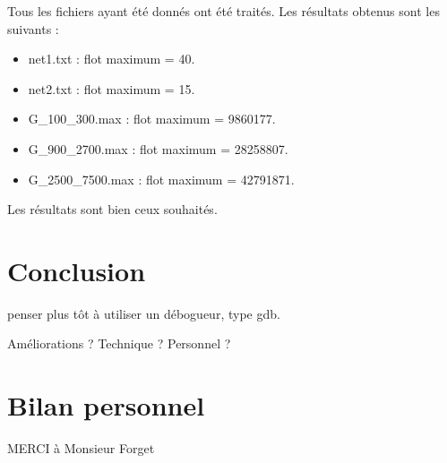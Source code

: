 \documentclass[11pt, a4paper]{report}
\begin{document}
	Tous les fichiers ayant été donnés ont été traités. Les résultats obtenus sont les suivants :
	\begin{itemize}
        \item net1.txt : flot maximum = 40.
        \item net2.txt : flot maximum = 15.
        \item G\_100\_300.max : flot maximum = 9860177.
        \item G\_900\_2700.max : flot maximum = 28258807.
        \item G\_2500\_7500.max : flot maximum = 42791871.
	\end{itemize}

	Les résultats sont bien ceux souhaités.
	
	
	\chapter*{Conclusion}
	penser plus tôt à utiliser un débogueur, type gdb.
	
	Améliorations ? Technique ? Personnel ?
	
	\chapter*{Bilan personnel}
	MERCI à Monsieur Forget
	
	
\end{document}
